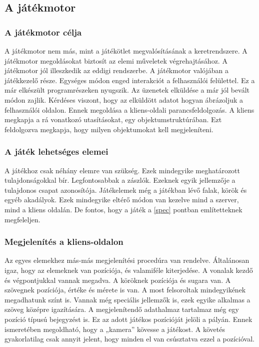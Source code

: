 \documentclass[bibliography=totocnumbered]{article}
\begin{document}
\subsection{A játékmotor}


\subsubsection{A játékmotor célja}

A játékmotor nem más, mint a játékötlet megvalósításának a
keretrendszere. A játékmotor megoldásokat biztosít az elemi műveletek
végrehajtásához. A játékmotor jól illeszkedik az eddigi rendszerbe. A
játékmotor valójában a játékkezelő része. Egységes módon enged
interakciót a felhasználói felülettel. Ez a már elkészült
programrészeken nyugszik. Az üzenetek elküldése a már jól bevált módon
zajlik. Kérdéses viszont, hogy az elküldött adatot hogyan ábrázoljuk a
felhasználói oldalon. Ennek megoldása a kliens-oldali
parancsfeldolgozás. A kliens megkapja a rá vonatkozó utasításokat, egy
objektumstruktúrában. Ezt feldolgozva megkapja, hogy milyen objektumokat
kell megjeleníteni.


\subsubsection{A játék lehetséges
elemei}

A játékhoz csak néhány elemre van szükség. Ezek mindegyike meghatározott
tulajdonságokkal bír. Legfontosabbak a zászlók. Ezeknek egyik jellemzője
a tulajdonos csapat azonosítója. Játékelemek még a játékban lévő falak,
körök és egyéb akadályok. Ezek mindegyike eltérő módon van kezelve mind
a szerver, mind a kliens oldalán. De fontos, hogy a játék a \ref{spec} pontban említetteknek megfeleljen.


\subsubsection{Megjelenítés a
kliens-oldalon}

Az egyes elemekhez más-más megjelenítési procedúra van rendelve.
Általánosan igaz, hogy az elemeknek van pozíciója, és valamiféle
kiterjedése. A vonalak kezdő és végpontjukkal vannak megadva. A köröknek
pozíciója és sugara van. A szövegnek pozíciója, értéke és mérete is van.
A most felsoroltak mindegyikének megadhatunk színt is. Vannak még
speciális jellemzők is, ezek egyike alkalmas a szöveg középre
igazítására. A megjelenítendő adathalmaz tartalmaz még egy pozíció
típusú bejegyzést is. Ez az adott játékos pozícióját jelöli a pályán.
Ennek ismeretében megoldható, hogy a „kamera'' kövesse a játékost. A
követés gyakorlatilag csak annyit jelent, hogy minden el van csúsztatva
ezzel a pozícióval.
\end{document}
